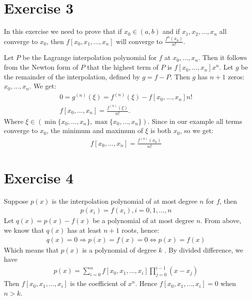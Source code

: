 \section{Exercise 3}
In this exercise we need to prove that if $x_0 \in (a,b)$ and if $x_1,x_2 , \ldots ,x_n$ all converge to $x_0$, then $f[x_0,x_1,\ldots,x_n]$ will converge to $\frac{f^n(x_0)}{n!}$.

Let $P$ be the Lagrange interpolation polynomial for $f$ at $x_0, ..., x_n$. Then it follows from the Newton form of $P$ that the highest term of $P$ is $f[x_0,\dots,x_n]x^n$.
Let $g$ be the remainder of the interpolation, defined by $g = f - P$. Then $g$ has $n+1$ zeros: $x_0, ..., x_n$.
We get:
\begin{gather*}
0 = g^{(n)}(\xi) = f^{(n)}(\xi) - f[x_0,\dots,x_n] n!\\
f[x_0,\dots,x_n] = \frac{f^{(n)}(\xi)}{n!}.
\end{gather*}
Where $ \xi \in (\min\{x_0,\dots,x_n\},\max\{x_0,\dots,x_n\}) $. Since in our example all terms converge to $x_0$, the minimum and maximum of $\xi$ is both $x_0$, so we get:
\begin{gather*}
f[x_0,\dots,x_n] = \frac{f^{(n)}(x_0)}{n!}
\end{gather*}
%
%

\section{Exercise 4}
Suppose $p(x)$ is the interpolation polynomial of at most degree $n$ for $f$, then
\begin{gather*}
p(x_i) = f(x_i), i = 0,1,\ldots,n
\end{gather*}
Let $q(x) = p(x) - f(x)$ be a polynomial of at most degree $n$. From above, we know that $q(x)$ has at least $n+1$ roots, hence:
\begin{gather*}
q(x) = 0 \Rightarrow p(x) =f(x) = 0 \Leftrightarrow p(x) = f(x)
\end{gather*}
Which means that $p(x)$ is a polynomial of degree $k$ . By divided difference, we have
\begin{gather*}
p(x) = \sum_{i=0}^{n} f [ x_0 , x_1 ,\ldots ,x_i] \prod_{j=0}^{i-1}(x - x_j)
\end{gather*}
Then $ f [ x_0 , x_1 ,\ldots ,x_i]$ is the coefficient of $x^n$. Hence $ f [ x_0 , x_1 ,\ldots ,x_i] = 0$ when $n > k$.
